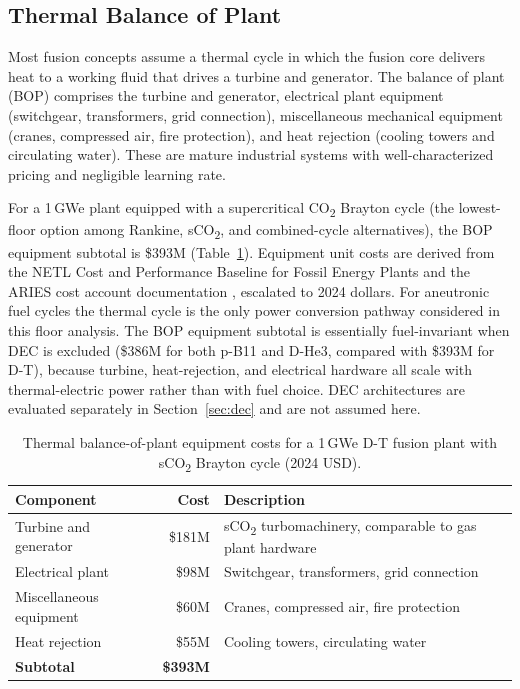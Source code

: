 \documentclass{article}
\begin{document}
\subsection{Thermal Balance of Plant}
\label{sec:bop}

Most fusion concepts assume a thermal cycle in which the fusion core
delivers heat to a working fluid that drives a turbine and
generator. The balance of plant (BOP) comprises the turbine and
generator, electrical plant equipment (switchgear, transformers,
grid connection), miscellaneous mechanical equipment (cranes,
compressed air, fire protection), and heat rejection (cooling towers
and circulating water). These are mature industrial systems with
well-characterized pricing and negligible learning rate.

For a 1\,GWe plant equipped with a supercritical CO\textsubscript{2}
Brayton cycle (the lowest-floor option among Rankine,
sCO\textsubscript{2}, and combined-cycle alternatives), the BOP
equipment subtotal is \$393M
(Table~\ref{tab:bop}). Equipment unit costs are derived from the
NETL Cost and Performance Baseline for Fossil Energy Plants
\citep{NETL2022} and the ARIES cost account documentation
\citep{Waganer2013}, escalated to 2024 dollars. For aneutronic fuel
cycles the thermal cycle is the only power conversion pathway
considered in this floor analysis. The BOP equipment subtotal is
essentially fuel-invariant when DEC is excluded (\$386M for both
p-B11 and D-He3, compared with \$393M for D-T), because turbine,
heat-rejection, and electrical hardware all scale with
thermal-electric power rather than with fuel choice. DEC
architectures are evaluated separately in Section~\ref{sec:dec}
and are not assumed here.

\begin{table}[htbp]
\caption{Thermal balance-of-plant equipment costs for a 1\,GWe D-T
fusion plant with sCO\textsubscript{2} Brayton cycle (2024 USD).}
\label{tab:bop}
\centering
\begin{tabular}{lrl}
\toprule
Component & Cost & Description \\
\midrule
Turbine and generator & \$181M & sCO\textsubscript{2}
turbomachinery, comparable to gas plant hardware \\
Electrical plant & \$98M & Switchgear, transformers, grid
connection \\
Miscellaneous equipment & \$60M & Cranes, compressed air, fire
protection \\
Heat rejection & \$55M & Cooling towers, circulating water \\
\midrule
\textbf{Subtotal} & \textbf{\$393M} & \\
\bottomrule
\end{tabular}
\end{table}
\end{document}

